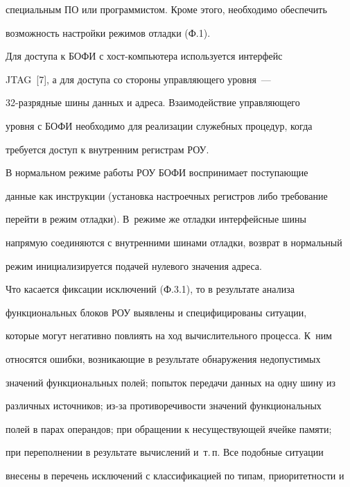 специальным ПО или программистом. Кроме этого, необходимо обеспечить 


возможность настройки режимов отладки (Ф.1).








      Для доступа к БОФИ с хост-компью\-те\-ра используется интерфейс 


JTAG~[7], а для доступа со стороны управ\-ля\-юще\-го уровня~--- 


      32-раз\-ряд\-ные шины данных и адреса. Взаимодействие управляющего 


уровня с БОФИ необходимо для реализации служебных процедур, когда 


требуется доступ к внутренним регистрам РОУ.


      


      В нормальном режиме работы РОУ БОФИ воспринимает поступающие 


данные как инструкции (установка настроечных регистров либо требование 


перейти в режим отладки). В~режиме же отладки интерфейсные шины 


напрямую соединяются с внутренними шинами отладки, возврат в нормальный 


режим инициализируется подачей нулевого значения адреса.


      


      Что касается фиксации исключений (Ф.3.1), то в результате анализа 


функциональных блоков РОУ выявлены и специфицированы ситуации, 


которые могут негативно повлиять на ход вычислительного процесса. К~ним 


относятся ошибки, возникающие в результате обнаружения недопустимых 


значений функциональных полей; попыток передачи данных на одну шину из 


различных источников; из-за противоречивости значений функциональных 


полей в парах операндов; при обращении к несуществующей ячейке памяти; 


при переполнении в результате вычислений и~т.\,п. Все подобные ситуации 


внесены в перечень исключений с классификацией по типам, приоритетности и 


